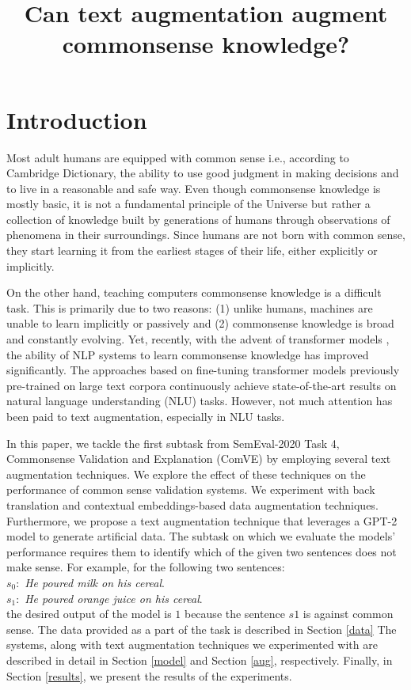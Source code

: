 \documentclass[10pt, a4paper]{article}
\title{Can text augmentation augment commonsense knowledge?}
\begin{document}
\maketitleabstract

\section{Introduction}

Most adult humans are equipped with common sense i.e., according to Cambridge Dictionary, the ability to use good judgment in making decisions and to live in a reasonable and safe way. Even though commonsense knowledge is mostly basic, it is not a fundamental principle of the Universe but rather a collection of knowledge built by generations of humans through observations of phenomena in their surroundings. Since humans are not born with common sense, they start learning it from the earliest stages of their life, either explicitly or implicitly.

On the other hand, teaching computers commonsense knowledge is a difficult task. This is primarily due to two reasons: (1) unlike humans, machines are unable to learn implicitly or passively and (2) commonsense knowledge is broad and constantly evolving. Yet, recently, with the advent of transformer models \citep{transformers}, the ability of NLP systems to learn commonsense knowledge has improved significantly. The approaches based on fine-tuning transformer models previously pre-trained on large text corpora continuously achieve state-of-the-art results on natural language understanding (NLU) tasks. However, not much attention has been paid to text augmentation, especially in NLU tasks.

In this paper, we tackle the first subtask from SemEval-2020 Task 4, Commonsense Validation and Explanation (ComVE) \citep{wang-etal-2020-semeval} by employing several text augmentation techniques. We explore the effect of these techniques on the performance of common sense validation systems. We experiment with back translation and contextual embeddings-based data augmentation techniques. Furthermore, we propose a text augmentation technique that leverages a GPT-2 model \citep{radford2019language} to generate artificial data. The subtask on which we evaluate the models' performance requires them to identify which of the given two sentences does not make sense. For example, for the following two sentences:\\
$s_0:$ \textit{He poured milk on his cereal}.\\
$s_1:$ \textit{He poured orange juice on his cereal}.\\
the desired output of the model is $1$ because the sentence $s1$ is against common sense. The data provided as a part of the task is described in Section \ref{data} The systems, along with text augmentation techniques we experimented with are described in detail in Section \ref{model} and Section \ref{aug}, respectively. Finally, in Section \ref{results}, we present the results of the experiments.
\end{document}
